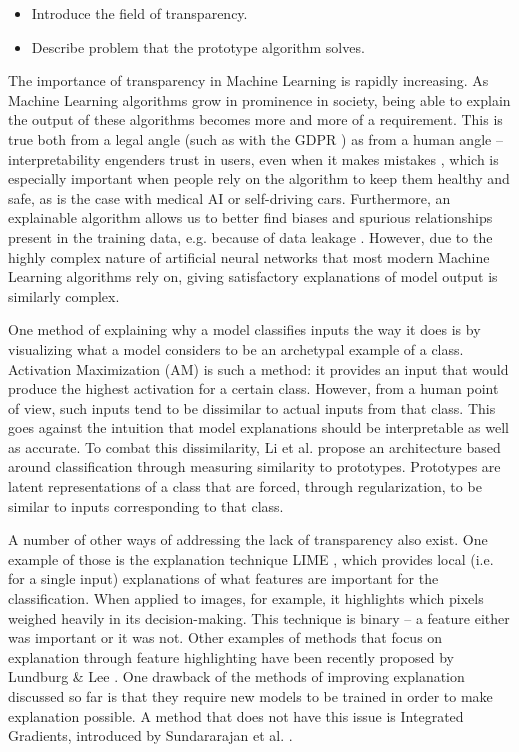 \begin{itemize}
    \item Introduce the field of transparency.
    \item Describe problem that the prototype algorithm solves.
\end{itemize}

The importance of transparency in Machine Learning is rapidly increasing. As Machine Learning algorithms grow in prominence in society, being able to explain the output of these algorithms becomes more and more of a requirement. This is true both from a legal angle (such as with the GDPR \citep{gdprart}) as from a human angle -- interpretability engenders trust in users, even when it makes mistakes \citep{automtrust}, which is especially important when people rely on the algorithm to keep them healthy and safe, as is the case with medical AI or self-driving cars. Furthermore, an explainable algorithm allows us to better find biases and spurious relationships present in the training data, e.g. because of data leakage \citep{dataleakage}. However, due to the highly complex nature of artificial neural networks that most modern Machine Learning algorithms rely on, giving satisfactory explanations of model output is similarly complex.

One method of explaining why a model classifies inputs the way it does is by visualizing what a model considers to be an archetypal example of a class. Activation Maximization (AM) \citep{activationmaximization} is such a method: it provides an input that would produce the highest activation for a certain class. However, from a human point of view, such inputs tend to be dissimilar to actual inputs from that class. This goes against the intuition that model explanations should be interpretable as well as accurate. To combat this dissimilarity, Li et al. \citep{li2018deep} propose an architecture based around classification through measuring similarity to prototypes. Prototypes are latent representations of a class that are forced, through regularization, to be similar to inputs corresponding to that class. 

A number of other ways of addressing the lack of transparency also exist. One example of those is the explanation technique LIME \citep{LIME}, which provides local (i.e. for a single input) explanations of what features are important for the classification. When applied to images, for example, it highlights which pixels weighed heavily in its decision-making. This technique is binary -- a feature either was important or it was not. Other examples of methods that focus on explanation through feature highlighting have been recently proposed by Lundburg \& Lee \citep{featureexamplepaper1}. One drawback of the methods of improving explanation discussed so far is that they require new models to be trained in order to make explanation possible. A method that does not have this issue is Integrated Gradients, introduced by Sundararajan et al. \citep{axioms}.

